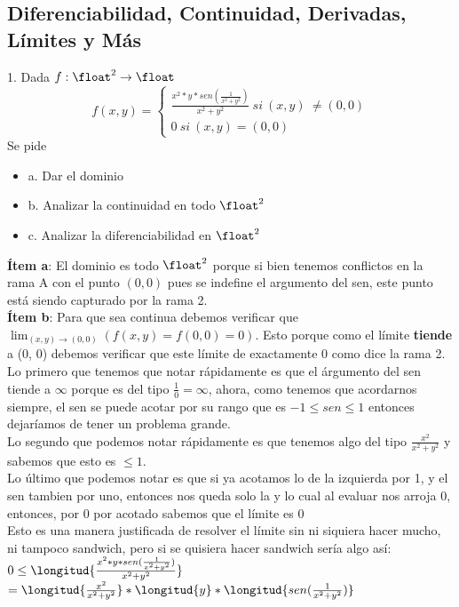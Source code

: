 \documentclass[10pt,a4paper]{article}
\begin{document}
\subsection*{Diferenciabilidad, Continuidad, Derivadas, Límites y Más}
\label{subsec:diferenciabilidad_continuidad_mas}
1. Dada $f:\float^{2} \rightarrow \float$
\[
f(x, y) =
\begin{cases} 
\frac{x^{2} * y * sen(\frac{1}{x^{2}+y^{2}})}{x^{2}+y^{2}} \ si \ (x, y) \ \neq (0, 0) \\
0 \ si \ (x, y) = (0, 0)
\end{cases}
\]
Se pide 
\begin{itemize}
    \item a. Dar el dominio
    \item b. Analizar la continuidad en todo $\float^{2}$
    \item c. Analizar la diferenciabilidad en $\float^{2}$
\end{itemize}
\textbf{Ítem a}: El dominio es todo $\float^{2}$ porque si bien tenemos conflictos en la rama A con el punto $(0,0)$ pues se indefine el argumento del sen, este punto está siendo capturado por la rama 2. \\
\textbf{Ítem b}: Para que sea continua debemos verificar que $\lim_{(x, y) \to (0, 0)} \left(f(x, y) = f(0, 0) = 0 \right)$. Esto porque como el límite \textbf{tiende} a (0, 0) debemos verificar que este límite de exactamente 0 como dice la rama 2. \\
Lo primero que tenemos que notar rápidamente es que el árgumento del sen tiende a $\infty$ porque es del tipo $ \frac{1}{0} = \infty$, ahora, como tenemos que acordarnos siempre, el sen se puede acotar por su rango que es $-1 \le sen \le 1$ entonces dejaríamos de tener un problema grande. \\
Lo segundo que podemos notar rápidamente es que tenemos algo del tipo $\frac{x^{2}}{x^{2} + y^{2}}$ y sabemos que esto es $\le 1$. \\
Lo último que podemos notar es que si ya acotamos lo de la izquierda por 1, y el sen tambien por uno, entonces nos queda solo la y lo cual al evaluar nos arroja 0, entonces, por 0 por acotado sabemos que el límite es 0 \\
Esto es una manera justificada de resolver el límite sin ni siquiera hacer mucho, ni tampoco sandwich, pero si se quisiera hacer sandwich sería algo así: 
$ 0 \le \longitud{\frac{x^{2} * y * sen(\frac{1}{x^{2}+y^{2}})}{x^{2} + y^{2}}}$ \\
$= \longitud{\frac{x^{2}}{x^{2} + y^{2}}} * \longitud{y} * \longitud{sen(\frac{1}{x^{2}+y^{2}})}$ \\
\end{document}

